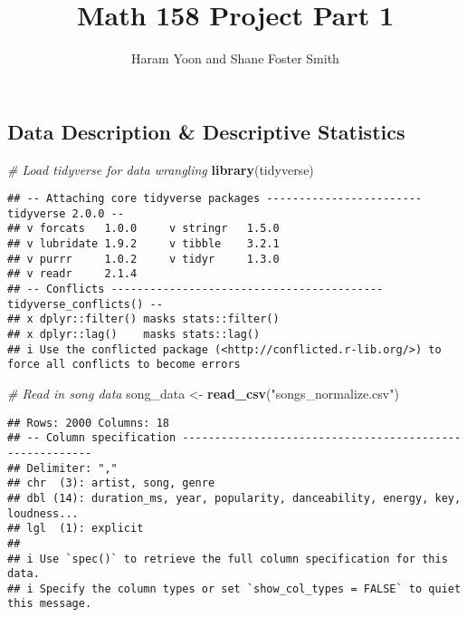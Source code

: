 \documentclass[
]{article}
\title{Math 158 Project Part 1}
\author{Haram Yoon and Shane Foster Smith}
\date{}
\newenvironment{Shaded}{\begin{snugshade}}{\end{snugshade}}
\newcommand{\CommentTok}[1]{\textcolor[rgb]{0.56,0.35,0.01}{\textit{#1}}}
\newcommand{\FunctionTok}[1]{\textcolor[rgb]{0.13,0.29,0.53}{\textbf{#1}}}
\newcommand{\NormalTok}[1]{#1}
\newcommand{\OtherTok}[1]{\textcolor[rgb]{0.56,0.35,0.01}{#1}}
\newcommand{\StringTok}[1]{\textcolor[rgb]{0.31,0.60,0.02}{#1}}
\begin{document}
\maketitle

\hypertarget{data-description-descriptive-statistics}{%
\subsection{Data Description \& Descriptive
Statistics}\label{data-description-descriptive-statistics}}

\begin{Shaded}
\begin{Highlighting}[]
\CommentTok{\# Load tidyverse for data wrangling}
\FunctionTok{library}\NormalTok{(tidyverse) }
\end{Highlighting}
\end{Shaded}

\begin{verbatim}
## -- Attaching core tidyverse packages ------------------------ tidyverse 2.0.0 --
## v forcats   1.0.0     v stringr   1.5.0
## v lubridate 1.9.2     v tibble    3.2.1
## v purrr     1.0.2     v tidyr     1.3.0
## v readr     2.1.4     
## -- Conflicts ------------------------------------------ tidyverse_conflicts() --
## x dplyr::filter() masks stats::filter()
## x dplyr::lag()    masks stats::lag()
## i Use the conflicted package (<http://conflicted.r-lib.org/>) to force all conflicts to become errors
\end{verbatim}

\begin{Shaded}
\begin{Highlighting}[]
\CommentTok{\# Read in song data}
\NormalTok{song\_data }\OtherTok{\textless{}{-}} \FunctionTok{read\_csv}\NormalTok{(}\StringTok{"songs\_normalize.csv"}\NormalTok{)}
\end{Highlighting}
\end{Shaded}

\begin{verbatim}
## Rows: 2000 Columns: 18
## -- Column specification --------------------------------------------------------
## Delimiter: ","
## chr  (3): artist, song, genre
## dbl (14): duration_ms, year, popularity, danceability, energy, key, loudness...
## lgl  (1): explicit
## 
## i Use `spec()` to retrieve the full column specification for this data.
## i Specify the column types or set `show_col_types = FALSE` to quiet this message.
\end{verbatim}
\end{document}
